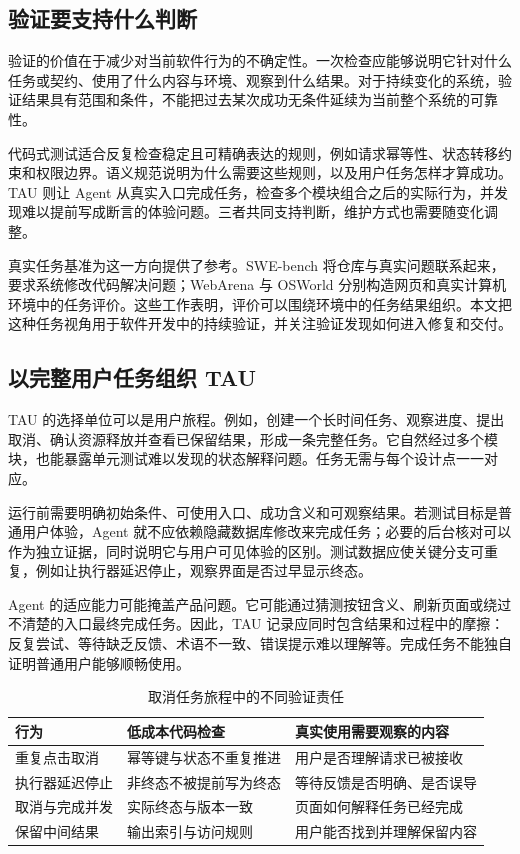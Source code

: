 \label{sec:validation}
\subsection{验证要支持什么判断}
验证的价值在于减少对当前软件行为的不确定性。一次检查应能够说明它针对什么任务或契约、使用了什么内容与环境、观察到什么结果。对于持续变化的系统，验证结果具有范围和条件，不能把过去某次成功无条件延续为当前整个系统的可靠性。

代码式测试适合反复检查稳定且可精确表达的规则，例如请求幂等性、状态转移约束和权限边界。语义规范说明为什么需要这些规则，以及用户任务怎样才算成功。TAU 则让 Agent 从真实入口完成任务，检查多个模块组合之后的实际行为，并发现难以提前写成断言的体验问题。三者共同支持判断，维护方式也需要随变化调整。

真实任务基准为这一方向提供了参考。SWE-bench 将仓库与真实问题联系起来，要求系统修改代码解决问题\cite{swebench}；WebArena 与 OSWorld 分别构造网页和真实计算机环境中的任务评价\cite{webarena,osworld}。这些工作表明，评价可以围绕环境中的任务结果组织。本文把这种任务视角用于软件开发中的持续验证，并关注验证发现如何进入修复和交付。

\subsection{以完整用户任务组织 TAU}
TAU 的选择单位可以是用户旅程。例如，创建一个长时间任务、观察进度、提出取消、确认资源释放并查看已保留结果，形成一条完整任务。它自然经过多个模块，也能暴露单元测试难以发现的状态解释问题。任务无需与每个设计点一一对应。

运行前需要明确初始条件、可使用入口、成功含义和可观察结果。若测试目标是普通用户体验，Agent 就不应依赖隐藏数据库修改来完成任务；必要的后台核对可以作为独立证据，同时说明它与用户可见体验的区别。测试数据应使关键分支可重复，例如让执行器延迟停止，观察界面是否过早显示终态。

Agent 的适应能力可能掩盖产品问题。它可能通过猜测按钮含义、刷新页面或绕过不清楚的入口最终完成任务。因此，TAU 记录应同时包含结果和过程中的摩擦：反复尝试、等待缺乏反馈、术语不一致、错误提示难以理解等。完成任务不能独自证明普通用户能够顺畅使用。

\begin{table}[htbp]\centering\small
\caption{取消任务旅程中的不同验证责任}\label{tab:tau}
\begin{tabularx}{\linewidth}{p{2.5cm}YY}\toprule
行为 & 低成本代码检查 & 真实使用需要观察的内容\\\midrule
重复点击取消 & 幂等键与状态不重复推进 & 用户是否理解请求已被接收\\
执行器延迟停止 & 非终态不被提前写为终态 & 等待反馈是否明确、是否误导\\
取消与完成并发 & 实际终态与版本一致 & 页面如何解释任务已经完成\\
保留中间结果 & 输出索引与访问规则 & 用户能否找到并理解保留内容\\\bottomrule
\end{tabularx}\end{table}

